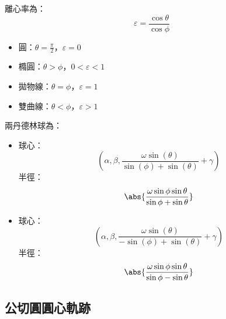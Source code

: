 \documentclass[a4paper,12pt]{report}
\begin{document}
離心率為：
\[\varepsilon=\frac{\cos\theta}{\cos\phi}\]
\begin{itemize}
\item 圓：$\theta=\frac{\pi}{2}$，$\varepsilon=0$
\item 橢圓：$\theta>\phi$，$0<\varepsilon<1$
\item 拋物線：$\theta=\phi$，$\varepsilon=1$
\item 雙曲線：$\theta<\phi$，$\varepsilon>1$
\end{itemize}

兩丹德林球為：
\begin{itemize}
\item 球心：
\[\left(\alpha,\beta,\frac{\omega\sin(\theta)}{\sin(\phi)+\sin(\theta)}+\gamma\right)\]
半徑：
\[\abs{\frac{\omega\sin\phi\sin\theta}{\sin\phi+\sin\theta}}\]
\item 球心：
\[\left(\alpha,\beta,\frac{\omega\sin(\theta)}{-\sin(\phi)+\sin(\theta)}+\gamma\right)\]
半徑：
\[\abs{\frac{\omega\sin\phi\sin\theta}{\sin\phi-\sin\theta}}\]
\end{itemize}
\subsection{公切圓圓心軌跡}
\end{document}
